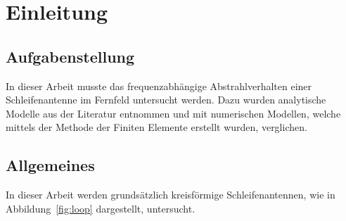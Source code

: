 \section{Einleitung}
\subsection{Aufgabenstellung}
In dieser Arbeit musste das frequenzabhängige Abstrahlverhalten einer Schleifenantenne im Fernfeld untersucht werden. Dazu wurden analytische Modelle aus der Literatur entnommen und mit numerischen Modellen, welche mittels der Methode der Finiten Elemente erstellt wurden, verglichen. 


\subsection{Allgemeines}
In dieser Arbeit werden grundsätzlich kreisförmige Schleifenantennen, wie in Abbildung~\ref{fig:loop} dargestellt, untersucht.

